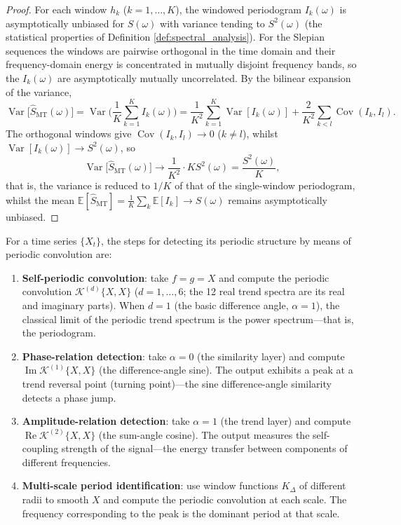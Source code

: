 \begin{proof}
For each window $h_k$ ($k = 1,\dots,K$), the windowed periodogram $I_k(\omega)$ is asymptotically unbiased for $S(\omega)$ with variance tending to $S^2(\omega)$ (the statistical properties of Definition \ref{def:spectral_analysis}). For the Slepian sequences the windows are pairwise orthogonal in the time domain and their frequency-domain energy is concentrated in mutually disjoint frequency bands, so the $I_k(\omega)$ are asymptotically mutually uncorrelated. By the bilinear expansion of the variance,
\[
\operatorname{Var}\big[\hat{S}_{\text{MT}}(\omega)\big]
= \operatorname{Var}\Big( \frac{1}{K}\sum_{k=1}^{K} I_k(\omega) \Big)
= \frac{1}{K^2}\sum_{k=1}^{K} \operatorname{Var}[I_k(\omega)] + \frac{2}{K^2}\sum_{k<l} \operatorname{Cov}(I_k, I_l).
\]
The orthogonal windows give $\operatorname{Cov}(I_k, I_l) \to 0$ ($k \neq l$), whilst $\operatorname{Var}[I_k(\omega)] \to S^2(\omega)$, so
\[
\operatorname{Var}\big[\hat{S}_{\text{MT}}(\omega)\big] \to \frac{1}{K^2}\cdot K S^2(\omega) = \frac{S^2(\omega)}{K},
\]
that is, the variance is reduced to $1/K$ of that of the single-window periodogram, whilst the mean $\mathbb{E}[\hat{S}_{\text{MT}}] = \frac{1}{K}\sum_k \mathbb{E}[I_k] \to S(\omega)$ remains asymptotically unbiased.
\end{proof}

\begin{definition}\label{def:periodic_transform_detection}
For a time series $\{X_t\}$, the steps for detecting its periodic structure by means of periodic convolution are:
\begin{enumerate}[label=(\roman*)]
    \item \textbf{Self-periodic convolution}: take $f = g = X$ and compute the periodic convolution $\mathcal{K}^{(d)}\{X, X\}$ ($d=1,\dots,6$; the 12 real trend spectra are its real and imaginary parts). When $d=1$ (the basic difference angle, $\alpha=1$), the classical limit of the periodic trend spectrum is the power spectrum---that is, the periodogram.
    \item \textbf{Phase-relation detection}: take $\alpha=0$ (the similarity layer) and compute $\operatorname{Im}\mathcal{K}^{(1)}\{X, X\}$ (the difference-angle sine). The output exhibits a peak at a trend reversal point (turning point)---the sine difference-angle similarity detects a phase jump.
    \item \textbf{Amplitude-relation detection}: take $\alpha=1$ (the trend layer) and compute $\operatorname{Re}\mathcal{K}^{(2)}\{X, X\}$ (the sum-angle cosine). The output measures the self-coupling strength of the signal---the energy transfer between components of different frequencies.
    \item \textbf{Multi-scale period identification}: use window functions $K_\Delta$ of different radii to smooth $X$ and compute the periodic convolution at each scale. The frequency corresponding to the peak is the dominant period at that scale.
\end{enumerate}
\end{definition}

